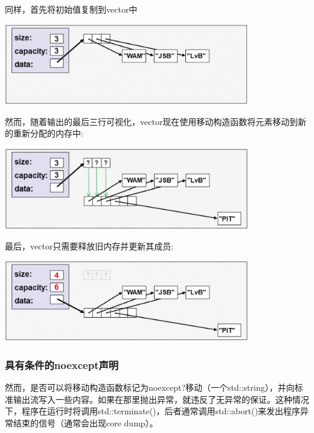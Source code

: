 同样，首先将初始值复制到vector中

\begin{center}
	\includegraphics[width=0.8\textwidth]{part1/ch7/images/4}
\end{center}

然而，随着输出的最后三行可视化，vector现在使用移动构造函数将元素移动到新的重新分配的内存中:

\begin{center}
	\includegraphics[width=0.8\textwidth]{part1/ch7/images/5}
\end{center}

最后，vector只需要释放旧内存并更新其成员:

\begin{center}
	\includegraphics[width=0.8\textwidth]{part1/ch7/images/6}
\end{center}

\subsubsection{具有条件的noexcept声明}

然而，是否可以将移动构造函数标记为noexcept?移动（一个std::string），并向标准输出流写入一些内容。如果在那里抛出异常，就违反了无异常的保证。这种情况下，程序在运行时将调用std::terminate()，后者通常调用std::abort()来发出程序异常结束的信号（通常会出现core dump）。

